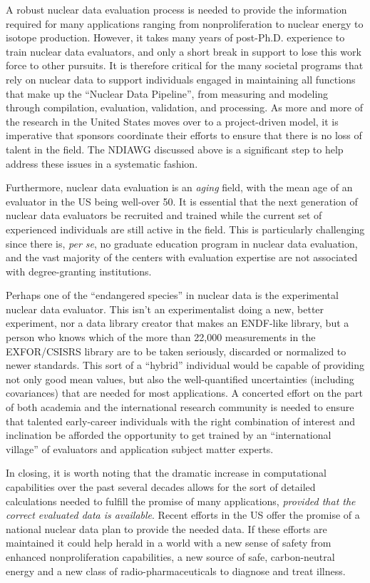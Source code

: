 \documentclass[letterpaper]{ar-1col}
\begin{document}
A robust nuclear data evaluation process is needed to provide the information required for many applications ranging from nonproliferation to nuclear energy to isotope production.
 However, it takes many years of post-Ph.D. experience to train nuclear data evaluators, and only a short break in support to lose  this work force to other pursuits.
 It is therefore critical for the many societal programs that rely on nuclear data to support individuals engaged in maintaining all functions that make up the \enquote{Nuclear Data Pipeline}, from measuring and modeling through compilation, evaluation, validation, and processing.
 As more and more of the research in the United States moves over to a project-driven model, it is imperative that sponsors coordinate their efforts to ensure that there is no loss of talent in the field.
 The NDIAWG discussed above is a significant step to help address these issues in a systematic fashion.

Furthermore, nuclear data evaluation is an \emph{aging} field, with the mean age of an evaluator in the US being well-over 50.
 It is essential that the next generation of nuclear data evaluators be recruited and trained while the current set of experienced individuals are still active in the field.
 This is particularly challenging since there is, \emph{per se}, no graduate education program in nuclear data evaluation, and the vast majority of the centers with evaluation expertise are not associated with degree-granting institutions.
 

Perhaps one of the \enquote{endangered species} in nuclear data is the experimental nuclear data evaluator.
 This isn't an experimentalist doing a new, better experiment, nor a data library creator that makes an ENDF-like library, but a person who knows which of the more than 22,000 measurements in the EXFOR/CSISRS library are to be taken seriously, discarded or normalized to newer standards.
 This sort of a \enquote{hybrid} individual would be capable of providing not only good mean values, but also the well-quantified uncertainties (including covariances) that are needed for most applications.
 A concerted effort on the part of both academia and the international research community is needed to ensure that talented early-career individuals with the right combination of interest and inclination be afforded the opportunity to get trained by an \enquote{international village} of evaluators and application subject matter experts.
 

In closing, it is worth noting that the dramatic increase in computational capabilities over the past several decades allows for the sort of detailed calculations needed to fulfill the promise of many applications, \emph{provided that the correct evaluated data is available}.
  Recent efforts in the US offer the promise of a national nuclear data plan to provide the needed data.
 If these efforts are maintained it could help herald in a world with a new sense of safety from enhanced nonproliferation capabilities, a new source of safe, carbon-neutral energy and a new class of radio-pharmaceuticals to diagnose and treat illness.  
\end{document}
